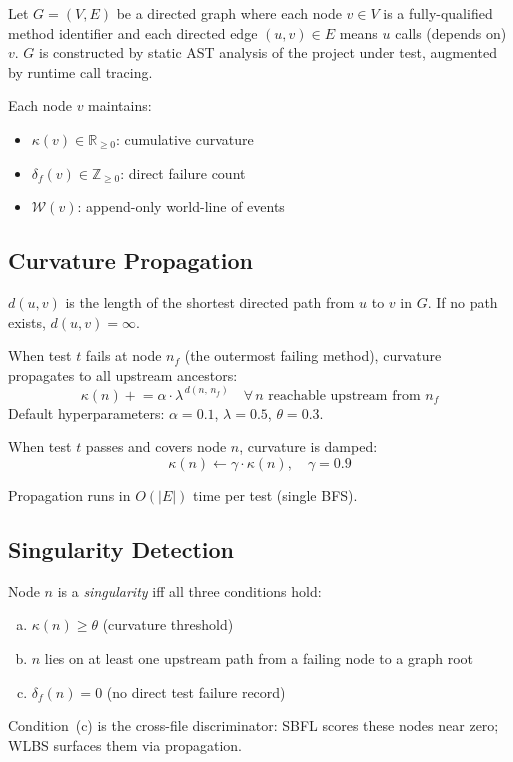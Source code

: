 \documentclass[acmtog]{acmart}
\begin{document}
Let $G = (V, E)$ be a directed graph where each node $v \in V$ is a
fully-qualified method identifier and each directed edge $(u, v) \in E$ means
$u$ calls (depends on) $v$. $G$ is constructed by static AST analysis of the
project under test, augmented by runtime call tracing.

Each node $v$ maintains:
\begin{itemize}
  \item $\kappa(v) \in \mathbb{R}_{\geq 0}$: cumulative curvature
  \item $\delta_f(v) \in \mathbb{Z}_{\geq 0}$: direct failure count
  \item $\mathcal{W}(v)$: append-only world-line of events
\end{itemize}

\subsection{Curvature Propagation}

\begin{definition}
$d(u, v)$ is the length of the shortest directed path from $u$ to $v$ in $G$.
If no path exists, $d(u,v) = \infty$.
\end{definition}

When test $t$ fails at node $n_f$ (the outermost failing method), curvature
propagates to all upstream ancestors:
\[
  \kappa(n) \mathrel{+}= \alpha \cdot \lambda^{\,d(n,\,n_f)}
  \quad \forall\, n \text{ reachable upstream from } n_f
\]
Default hyperparameters: $\alpha = 0.1$, $\lambda = 0.5$, $\theta = 0.3$.

When test $t$ passes and covers node $n$, curvature is damped:
\[
  \kappa(n) \leftarrow \gamma \cdot \kappa(n), \quad \gamma = 0.9
\]

Propagation runs in $O(|E|)$ time per test (single BFS).

\subsection{Singularity Detection}

\begin{definition}[Singularity]
Node $n$ is a \emph{singularity} iff all three conditions hold:
\begin{enumerate}[(a)]
  \item $\kappa(n) \geq \theta$ (curvature threshold)
  \item $n$ lies on at least one upstream path from a failing node to a graph root
  \item $\delta_f(n) = 0$ (no direct test failure record)
\end{enumerate}
Condition~(c) is the cross-file discriminator: SBFL scores these nodes near
zero; WLBS surfaces them via propagation.
\end{definition}
\end{document}
